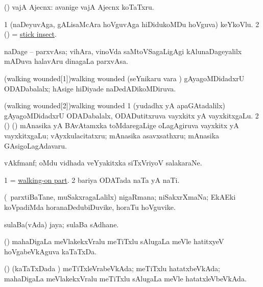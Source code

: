 \bentry
{} 
\gl{\nA}
\expl{}
\bmng
(\AmA) vajA Ajecnx:  avanige vajA Ajecnx koTaTxru. 
\emng
\eentry

\bentry
{} 
\gl{\nA}
\expl{}
\bmng
\bnum
\num{1} (naDeyuvAga, gALisaMcAra hoVguvAga hiDidukoMDu hoVguva) keYkoVlu. 
\num{2} (\ame) = \hyperref{kandict_s.pdf}{S}{stick insect}{stick insect}. 
\enum
\emng
\eentry

\bentry
{} 
\gl{\nA}
\expl{}
\bmng
naDage -- parxvAsa; vihAra, vinoVda saMtoVSagaLigAgi kAlunaDageyalilx mADuva halavAru dinagaLa parxvAsa. 
\emng
\eentry

\bentry
\word(walking wounded[1]){walking wounded}
\pron{}
\gl{\gu}
\expl{}
\bmng
(seYnikaru \mo vara \vi) gAyagoMDidadxrU ODADabalalx; hAsige hiDiyade naDedADikoMDiruva. 
\emng
\eentry

\bentry
\word(walking wounded[2]){walking wounded}
\pron{}
\gl{\nA}
\expl{}
\bmng
\bnum
\num{1} (yudadhx yA apaGAtadalilx) gAyagoMDidadxrU ODADabalalx, ODADutitxruva vayxkitx yA vayxkitxgaLu. 
\num{2} (\AmA) (\kanmu) mAnasika yA BAvAtamxka toMdaregaLige oLagAgiruva vayxkitx yA vayxkitxgaLu; vAyxkulacitatxru; mAnasika asavxsathxru; mAnasika GAsigoLagAdavaru. 
\enum
\emng
\eentry

\bentry
{} 
\gl{\nA}
\bmng
vAkfmanf; oMdu vidhada veYyakitxka siTxVriyoV salakaraNe. 
\emng
\eentry

\bentry
{} 
\gl{\nA}
\expl{}
\bmng
\bnum
\num{1} = \hyperlink{walking-on part}{walking-on part}. 
\num{2} bariya ODATada naTa yA naTi. 
\enum
\emng
\eentry

\bentry
{} 
\gl{\nA}
\expl{}
\bmng
(\kanmu\ parxtiBaTane, muSakxragaLalilx) nigaRmana; niSakxrXmaNa; EkAEki koVpadiMda horanaDedubiDuvike, horaTu hoVguvike. 
\emng
\eentry

\bentry
{} 
\gl{\nA}
\expl{}
\bmng
sulaBa(vAda) jaya; sulaBa sAdhane. 
\emng
\eentry

\bentry
{} 
\gl{\nA}
\expl{}
\bmng
(\ame) mahaDigaLa meVlakekxVralu meTiTxlu sAlugaLa meVle hatitxyeV hoVgabeVkAguva kaTaTxDa. 
\emng
\eentry

\bentry
{} 
\gl{\gu}
\expl{}
\bmng
(\ame) (kaTaTxDada \vi) meTiTxleVrabeVkAda; meTiTxlu hatatxbeVkAda; mahaDigaLa meVlakekxVralu meTiTxlu sAlugaLa meVle hatatxleVbeVkAda. 
\emng
\eentry

